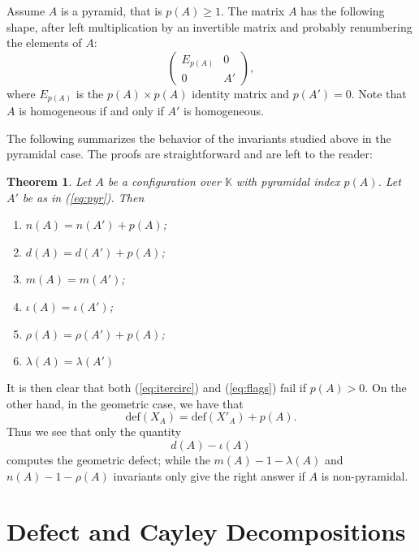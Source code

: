 \documentclass[11pt]{amsart}
\theoremstyle{plain}
\newtheorem{theorem}{Theorem}[section]
\theoremstyle{definition}
\theoremstyle{remark}
\renewcommand{\k}{{\mathbb K}}
\numberwithin{equation}{section}
\begin{document}
Assume $A$ is a pyramid, that is $p(A) \ge 1$. The matrix $A$  has the following shape, after
 left multiplication by an invertible matrix and probably renumbering the elements of $A$:
 \begin{equation}
\label{eq:pyr}
\left(\begin{array}{cc}
 E_{p(A)} & 0 \\
0 &  A'
\end{array}\right),
\end{equation}
 where $E_{p(A)}$ is the $p(A)\times p(A)$ identity matrix and  $p(A')=0$.
Note that  $A$ is homogeneous if and only if $A'$ is homogeneous.
 
 The following summarizes the behavior of the invariants studied above in the pyramidal case.  
 The proofs are straightforward and are left to the reader:
 
 
\begin{theorem}\label{th:pyramid} 
Let $A$ be a configuration over $\k$ with pyramidal index $p(A)$.  Let $A'$ be as in (\ref{eq:pyr}).  Then
\begin{enumerate}
\item[i)] $n(A) = n(A') + p(A)$;
\item[ii)] $d(A) = d(A') + p(A)$;
\item[iii)] $m(A) = m(A')$;
\item[iv)] $\iota(A) = \iota(A')$;
\item[v)] $\rho(A) = \rho(A') + p(A)$;
\item[vi)] $\lambda(A) = \lambda(A')$
\end{enumerate}
\end{theorem}

It is then clear that both (\ref{eq:itercirc}) and (\ref{eq:flags})  fail if $p(A)>0$.  
On the other hand, in the geometric case, 
we have that
$${\mathrm {def}}(X_A) = {\mathrm {def}}(X'_A) + p(A).$$
Thus we see that only the quantity
$$d(A) - \iota(A)$$
computes the geometric defect; while the $m(A)-1-\lambda(A)$ and $n(A)-1-\rho(A)$ invariants only give the right answer if $A$ is non-pyramidal.


\section{Defect and Cayley Decompositions}\label{sec:cayley}
\end{document}
